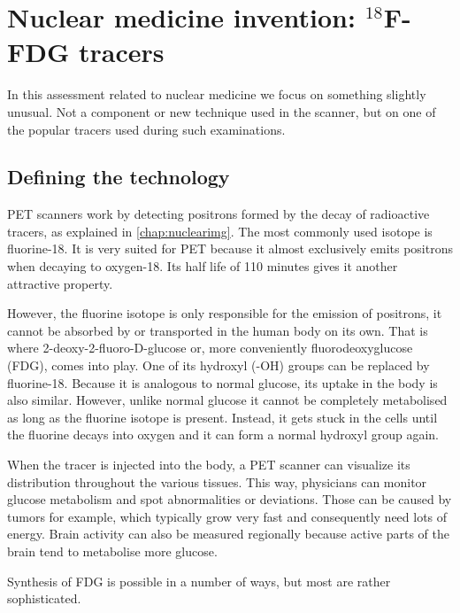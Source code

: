 \section{Nuclear medicine invention: $^{18}$F-FDG tracers}
In this assessment related to nuclear medicine we focus on something slightly
unusual. Not a component or new technique used in the scanner, but on one of the
popular tracers used during such examinations.

\subsection{Defining the technology}
PET scanners work by detecting positrons formed by the decay of radioactive
tracers, as explained in \autoref{chap:nuclearimg}. The most commonly used
isotope is fluorine-18. It is very suited for PET because it almost exclusively
emits positrons when decaying to oxygen-18. Its half life of 110 minutes gives
it another attractive property.


However, the fluorine isotope is only responsible for the emission of positrons,
it cannot be absorbed by or transported in the human body on its own. That is
where 2-deoxy-2-fluoro-D-glucose or, more conveniently fluorodeoxyglucose (FDG),
comes into play. One of its hydroxyl (-OH) groups can be replaced by
fluorine-18. Because it is analogous to normal glucose, its uptake in the body
is also similar. However, unlike normal glucose it cannot be completely
metabolised as long as the fluorine isotope is present. Instead, it gets stuck
in the cells until the fluorine decays into oxygen and it can form a normal
hydroxyl group again.

When the tracer is injected into the body, a PET scanner can visualize its
distribution throughout the various tissues. This way, physicians can monitor
glucose metabolism and spot abnormalities or deviations. Those can be caused by
tumors for example, which typically grow very fast and consequently need lots of
energy. Brain activity can also be measured regionally because active parts of
the brain tend to metabolise more glucose.

Synthesis of FDG is possible in a number of ways, but most are rather
sophisticated. 



